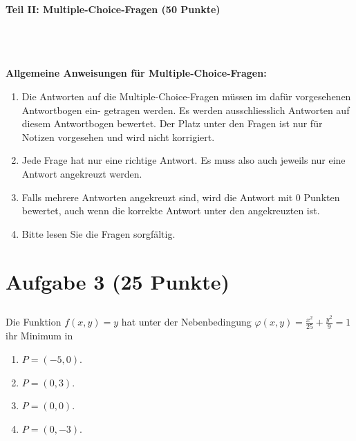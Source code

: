 \begin{Large}
\textbf{Teil II: Multiple-Choice-Fragen (50 Punkte)}
\end{Large}
\\
\\
\\
\textbf{Allgemeine Anweisungen für Multiple-Choice-Fragen:}
\\
\renewcommand{\labelenumi}{(\roman{enumi})}
\begin{enumerate}
\item
Die Antworten auf die Multiple-Choice-Fragen müssen im dafür vorgesehenen Antwortbogen ein-
getragen werden. Es werden ausschliesslich Antworten auf diesem Antwortbogen bewertet. Der
Platz unter den Fragen ist nur für Notizen vorgesehen und wird nicht korrigiert.

\item
Jede Frage hat nur eine richtige Antwort. Es muss also auch jeweils nur eine Antwort angekreuzt
werden.

\item
Falls mehrere Antworten angekreuzt sind, wird die Antwort mit 0 Punkten bewertet, auch wenn
die korrekte Antwort unter den angekreuzten ist.

\item
Bitte lesen Sie die Fragen sorgfältig.

\end{enumerate}
\newpage
\section*{Aufgabe 3 (25 Punkte)}
\vspace{0.4cm}
\subsection*{}
Die Funktion $ f(x,y) = y  $ hat unter der Nebenbedingung $ \varphi(x,y) = \frac{x^2}{25} + \frac{y^2}{9} = 1 $
ihr Minimum in
\renewcommand{\labelenumi}{(\alph{enumi})}
\begin{enumerate}
\item $ P = (-5,0) $.
\item $ P = (0,3) $.
\item $ P = (0,0) $.
\item $ P = (0,-3) $.
\end{enumerate}
\ \\
